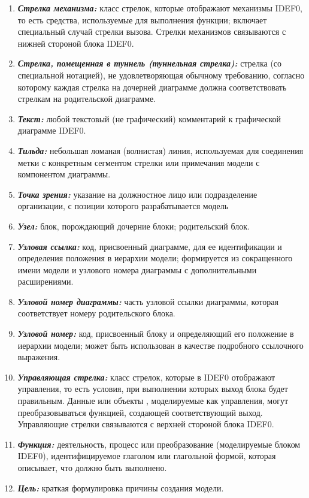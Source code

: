 \documentclass[a4paper, final]{article}
\begin{document}
\begin{enumerate}
  \item \textbf{\textit{Стрелка механизма:}} класс стрелок, которые отображают механизмы IDEF0, то есть средства, используемые для выполнения функции; включает специальный случай стрелки вызова. Стрелки механизмов связываются с нижней стороной блока IDEF0.
  \item \textbf{\textit{Стрелка, помещенная в туннель (туннельная стрелка):}} стрелка (со специальной нотацией), не удовлетворяющая обычному требованию, согласно которому каждая стрелка на дочерней диаграмме должна соответствовать стрелкам на родительской диаграмме.
  \item \textbf{\textit{Текст:}} любой текстовый (не графический) комментарий к графической диаграмме IDEF0.
  \item \textbf{\textit{Тильда:}} небольшая ломаная (волнистая) линия, используемая для соединения метки с конкретным сегментом стрелки или примечания модели с компонентом диаграммы.
  \item \textbf{\textit{Точка зрения:}} указание на должностное лицо или подразделение организации, с позиции которого разрабатывается модель
  \item \textbf{\textit{Узел:}} блок, порождающий дочерние блоки; родительский блок.
  \item \textbf{\textit{Узловая ссылка:}} код, присвоенный диаграмме, для ее идентификации и определения положения в иерархии модели; формируется из сокращенного имени модели и узлового номера диаграммы с дополнительными расширениями.
  \item \textbf{\textit{Узловой номер диаграммы:}} часть узловой ссылки диаграммы, которая соответствует номеру родительского блока.
  \item \textbf{\textit{Узловой номер:}} код, присвоенный блоку и определяющий его положение в иерархии модели; может быть использован в качестве подробного ссылочного выражения.
  \item \textbf{\textit{Управляющая стрелка:}} класс стрелок, которые в IDEF0 отображают управления, то есть условия, при выполнении которых выход блока будет правильным. Данные или объекты , моделируемые как управления, могут преобразовываться функцией, создающей соответствующий выход. Управляющие стрелки связываются с верхней стороной блока IDEF0.
  \item \textbf{\textit{Функция:}} деятельность, процесс или преобразование (моделируемые  блоком IDEF0), идентифицируемое глаголом или глагольной формой, которая описывает, что должно быть выполнено.
  \item \textbf{\textit{Цель:}} краткая формулировка причины создания модели. \cite{bib:gost_idef0}
\end{enumerate}
\end{document}
